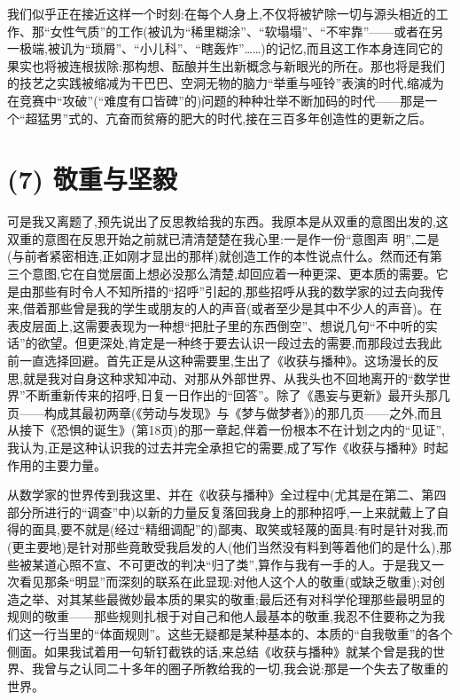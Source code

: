 我们似乎正在接近这样一个时刻:在每个人身上,不仅将被铲除一切与源头相近的工作、那“女性气质”的工作(被讥为“稀里糊涂”、“软塌塌”、“不牢靠”——或者在另一极端,被讥为“琐屑”、“小儿科”、“瞎轰炸”……)的记忆,而且这工作本身连同它的果实也将被连根拔除:那构想、酝酿并生出新概念与新眼光的所在。那也将是我们的技艺之实践被缩减为干巴巴、空洞无物的脑力“举重与哑铃”表演的时代,缩减为在竞赛中“攻破”(“难度有口皆碑”的)问题的种种壮举不断加码的时代——那是一个“超猛男”式的、亢奋而贫瘠的肥大的时代,接在三百多年创造性的更新之后。

\section{(7) 敬重与坚毅}

可是我又离题了,预先说出了反思教给我的东西。我原本是从双重的意图出发的,这双重的意图在反思开始之前就已清清楚楚在我心里:一是作一份“意图声
明”,二是(与前者紧密相连,正如刚才显出的那样)就创造工作的本性说点什么。然而还有第三个意图,它在自觉层面上想必没那么清楚,却回应着一种更深、更本质的需要。它是由那些有时令人不知所措的“招呼”引起的,那些招呼从我的数学家的过去向我传来,借着那些曾是我的学生或朋友的人的声音(或者至少是其中不少人的声音)。在表皮层面上,这需要表现为一种想“把肚子里的东西倒空”、想说几句“不中听的实话”的欲望。但更深处,肯定是一种终于要去认识一段过去的需要,而那段过去我此前一直选择回避。首先正是从这种需要里,生出了《收获与播种》。这场漫长的反思,就是我对自身这种求知冲动、对那从外部世界、从我头也不回地离开的“数学世界”不断重新传来的招呼,日复一日作出的“回答”。除了《愚妄与更新》最开头那几页——构成其最初两章(《劳动与发现》与《梦与做梦者》)的那几页——之外,而且从接下《恐惧的诞生》(第18页)的那一章起,伴着一份根本不在计划之内的“见证”,我认为,正是这种认识我的过去并完全承担它的需要,成了写作《收获与播种》时起作用的主要力量。

从数学家的世界传到我这里、并在《收获与播种》全过程中(尤其是在第二、第四部分所进行的“调查”中)以新的力量反复落回我身上的那种招呼,一上来就戴上了自得的面具,要不就是(经过“精细调配”的)鄙夷、取笑或轻蔑的面具:有时是针对我,而(更主要地)是针对那些竟敢受我启发的人(他们当然没有料到等着他们的是什么),那些被某道心照不宣、不可更改的判决“归了类”,算作与我有一手的人。于是我又一次看见那条“明显”而深刻的联系在此显现:对他人这个人的敬重(或缺乏敬重);对创造之举、对其某些最微妙最本质的果实的敬重;最后还有对科学伦理那些最明显的规则的敬重——那些规则扎根于对自己和他人最基本的敬重,我忍不住要称之为我们这一行当里的“体面规则”。这些无疑都是某种基本的、本质的“自我敬重”的各个侧面。如果我试着用一句斩钉截铁的话,来总结《收获与播种》就某个曾是我的世界、我曾与之认同二十多年的圈子所教给我的一切,我会说:那是一个失去了敬重的世界。

